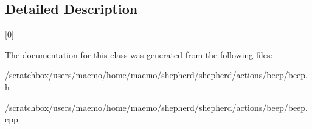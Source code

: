 \subsection{Detailed Description}
\mbox{[}0\mbox{]} 

The documentation for this class was generated from the following files:\begin{CompactItemize}
\item 
/scratchbox/users/maemo/home/maemo/shepherd/shepherd/actions/beep/beep.h\item 
/scratchbox/users/maemo/home/maemo/shepherd/shepherd/actions/beep/beep.cpp\end{CompactItemize}
